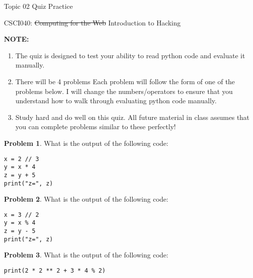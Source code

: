\documentclass[10pt]{article}
\theoremstyle{definition}
\newtheorem{problem}{Problem}
\begin{document}
\begin{center}
    {
\Large
    Topic 02 Quiz Practice
}

    \vspace{0.1in}
    CSCI040: \sout{Computing for the Web} Introduction to Hacking

    \vspace{0.1in}
\end{center}

\noindent
\textbf{NOTE:}
\begin{enumerate}
\item
The quiz is designed to test your ability to read python code and evaluate it manually.
\item
There will be 4 problems
Each problem will follow the form of one of the problems below.
I will change the numbers/operators to ensure that you understand how to walk through evaluating python code manually.
\item
Study hard and do well on this quiz.
All future material in class assumes that you can complete problems similar to these perfectly!
\end{enumerate}
\vspace{0.1in}

\begin{problem}
    What is the output of the following code:
\end{problem}
\begin{lstlisting}
x = 2 // 3
y = x * 4
z = y + 5
print("z=", z)
\end{lstlisting}
\vspace{0.1in}

\begin{problem}
    What is the output of the following code:
\end{problem}
\begin{lstlisting}
x = 3 // 2
y = x % 4
z = y - 5
print("z=", z)
\end{lstlisting}
\vspace{0.1in}


\begin{problem}
    What is the output of the following code:
\end{problem}
\begin{lstlisting}
print(2 * 2 ** 2 + 3 * 4 % 2)
\end{lstlisting}
\vspace{0.1in}
\end{document}
